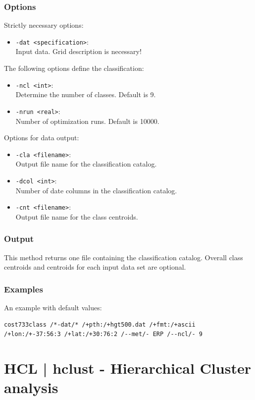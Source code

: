 \documentclass[12pt, oneside, a4paper, headsepline, plainheadsepline]{scrbook}
\begin{document}
\subsubsection*{Options}
Strictly necessary options:
\begin{itemize}
 \item \verb+-dat <specification>+:\\ Input data. Grid description is necessary!
\end{itemize}
The following options define the classification:
\begin{itemize}
 \item \verb+-ncl <int>+:\\ Determine the number of classes. Default is 9.
 \item \verb+-nrun <real>+:\\ Number of optimization runs. Default is 10000.
\end{itemize}
Options for data output:
\begin{itemize}
 \item \verb+-cla <filename>+:\\ Output file name for the classification catalog.
 \item \verb+-dcol <int>+:\\ Number of date columns in the classification catalog.
 \item \verb+-cnt <filename>+:\\ Output file name for the class centroids.
\end{itemize}

\subsubsection*{Output}
This method returns one file containing the classification catalog. 
Overall class centroids and centroids for each input data set are optional.

\subsubsection*{Examples}
An example with default values:
\begin{lstlisting}
cost733class /*-dat/* /+pth:/+hgt500.dat /+fmt:/+ascii /+lon:/+-37:56:3 /+lat:/+30:76:2 /--met/- ERP /--ncl/- 9  
\end{lstlisting}


\section{HCL | hclust - Hierarchical Cluster analysis}
\label{hcl}
\end{document}

